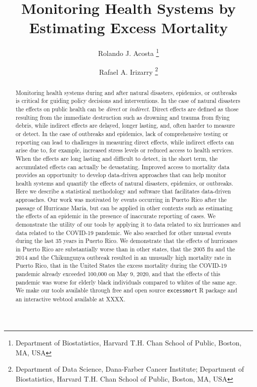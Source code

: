 \documentclass[11pt]{article}
\begin{document}
\title{Monitoring Health Systems by Estimating Excess Mortality}
 
\author{
{Rolando J. Acosta \footnote{Department of Biostatistics, Harvard T.H. Chan School of Public, Boston, MA, USA}} \and {Rafael A. Irizarry \footnote{Department of Data Science, Dana-Farber Cancer Institute; \newline Department of Biostatistics, Harvard T.H. Chan School of Public, Boston, MA, USA}}
}

\maketitle
\setcounter{page}{0}

\begin{abstract}
Monitoring health systems during and after natural disasters, epidemics, or outbreaks is critical for guiding policy decisions and interventions. In the case of natural disasters the effects on public health can be \textit{direct} or \textit{indirect}. Direct effects are defined as those resulting from the immediate destruction such as drowning and trauma from flying debris, while indirect effects are delayed, longer lasting, and, often harder to measure or detect. In the case of outbreaks and epidemics, lack of comprehensive testing or reporting can lead to challenges in measuring direct effects, while indirect effects can arise due to, for example, increased stress levels or reduced access to health services. When the effects are long lasting and difficult to detect, in the short term, the accumulated effects can actually be devastating. Improved access to mortality data provides an opportunity to develop data-driven approaches that can help monitor health systems and quantify the effects of natural disasters, epidemics, or outbreaks. Here we describe a statistical methodology and software that facilitates data-driven approaches. Our work was motivated by events occurring in Puerto Rico after the passage of Hurricane Mar\'ia, but can be applied in other contexts such as estimating the effects of an epidemic in the presence of inaccurate reporting of cases. We demonstrate the utility of our tools by applying it to data related to six hurricanes and data related to the COVID-19 pandemic. We also searched for other unusual events during the last 35 years in Puerto Rico. We demonstrate that the effects of hurricanes in Puerto Rico are substantially worse than in other states, that the 2005 flu and the 2014 and the Chikungunya outbreak resulted in an unusually high mortality rate in Puerto Rico, that in the United States the excess mortality during the COVID-19 pandemic already exceeded 100,000 on May 9, 2020, and that the effects of this pandemic was worse for elderly black individuals compared to whites of the same age. We make our tools available through free and open source \verb+excessmort+ R package  and an interactive webtool available at XXXX.
\end{abstract}
\end{document}
